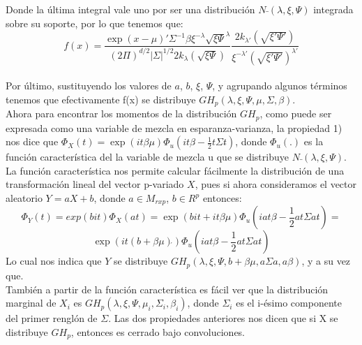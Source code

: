 \documentclass[11pt]{book}
\begin{document}
Donde la última integral vale uno por ser una distribución $N\bar{}(\lambda\acute{},\xi\acute{},\Psi\acute{})$ integrada sobre su soporte, por lo que tenemos que:\\

\begin{equation*}
f(x)=\frac{\exp{(x-\mu)'\Sigma^{-1}\beta}\xi^{-\lambda}\sqrt{\xi\Psi}^{\lambda}}{(2\Pi)^{d/2}|\Sigma|^{1/2}2k_{\lambda}(\sqrt{\xi\Psi})}\frac{2k_{\lambda'}(\sqrt{\xi'\Psi'})}{\xi^{-\lambda'}(\sqrt{\xi'\Psi'})^{\lambda'}}
\end{equation*}\\

Por último, sustituyendo los valores de $a$, $b$, $\xi\acute{}$, $\Psi\acute{}$, y agrupando algunos términos tenemos que efectivamente f(x) se distribuye $GH_{p}(\lambda,\xi,\Psi,\mu,\Sigma,\beta)$.\\

Ahora para encontrar los momentos de la distribución $GH_{p}$, como puede ser expresada como una variable de mezcla en esparanza-varianza, la propiedad 1) nos dice que $\Phi_{X}(t)=\exp(it\beta\mu\acute{})\Phi_{u}(it\beta\acute{}-\frac{1}{2}t\Sigma t\acute{})$, donde $\Phi_{u}(.)$ es la función característica del la variable de mezcla u que se distribuye $N\bar{}(\lambda,\xi,\Psi)$.\\

 La función característica nos permite calcular fácilmente la distribución de una transformación lineal del vector p-variado $X$, pues si ahora consideramos el vector aleatorio $Y=aX+b$, donde $a\in M_{rxp}$, $b\in R^{p}$ entonces:
\begin{equation*}
\Phi_{Y}(t)=exp(bit)\Phi_{X}(at)=\exp(bit+it\beta\mu\acute{})\Phi_{u}(iat\beta\acute{}-\frac{1}{2}at\Sigma at\acute{})=
\end{equation*}
\begin{equation*}
\exp(it(b+\beta\mu)\acute{})\Phi_{u}(iat\beta\acute{}-\frac{1}{2}at\Sigma at\acute{})
\end{equation*}
Lo cual nos indica que $Y$ se distribuye $GH_{p}(\lambda,\xi,\Psi,b+\beta\mu,a\Sigma a\acute{},a\beta)$, y a su vez que.\\

También a partir de la función característica es fácil ver que la distribución marginal de $X_{i}$ es 
$GH_{p}(\lambda,\xi,\Psi,\mu_{i},\Sigma _{i},\beta_{i})$, donde $\Sigma_{i}$ es el i-ésimo componente del primer renglón de $\Sigma$. Las dos propiedades anteriores nos dicen que si X se distribuye $GH_{p}$, entonces es cerrado bajo convoluciones.
\end{document}
